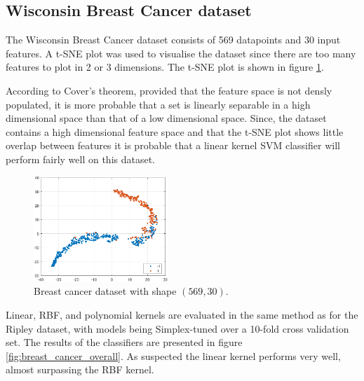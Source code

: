 \documentclass{article}
\begin{document}
    \subsection{Wisconsin Breast Cancer dataset}
        The Wisconsin Breast Cancer dataset consists of 569 datapoints and 30 input features. A t-SNE plot was used to visualise the dataset since there are too many features to plot in 2 or 3 dimensions. The t-SNE plot is shown in figure \ref{fig:breast_cancer_dataset}.  
        
        According to Cover's theorem, provided that the feature space is not densly populated, it is more probable that a set is linearly separable in a high dimensional space than that of a low dimensional space. Since, the dataset contains a high dimensional feature space and that the t-SNE plot shows little overlap between features it is probable that a linear kernel SVM classifier will perform fairly well on this dataset. 
        
        \begin{figure}[H]
            \centering
            \includegraphics[width=0.450\textwidth]{Assignment 1/figures/breast_data.pdf}
            \caption{Breast cancer dataset with shape $(569,30)$.}
            \label{fig:breast_cancer_dataset}
        \end{figure}
        
        Linear, RBF, and polynomial kernels are evaluated in the same method as for the Ripley dataset, with models being Simplex-tuned over a 10-fold cross validation set. The results of the classifiers are presented in figure \ref{fig:breast_cancer_overall}. As suspected the linear kernel performs very well, almost surpassing the RBF kernel.
        
\end{document}
